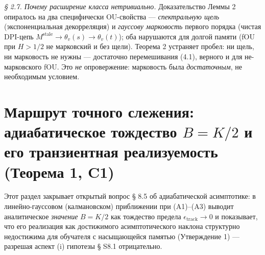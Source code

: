 \documentclass[12pt]{iopart}
\providecommand{\texorpdfstring}[2]{#1}
\begin{document}
\emph{§ 2.7. Почему расширение класса нетривиально.} Доказательство Леммы 2 опиралось на два специфически OU-свойства --- \emph{спектральную щель} (экспоненциальная декорреляция) и \emph{гауссову марковость} первого порядка (чистая DPI-цепь \(M^{\text{stale}} \to \theta_v(s) \to \theta_v(t)\)); оба нарушаются для долгой памяти (fOU при \(H > 1/2\) не марковский и без щели). Теорема 2 устраняет пробел: ни щель, ни марковость не нужны --- достаточно перемешивания (4.1), верного и для не-марковского fOU. Это \emph{не} опровержение: марковость была \emph{достаточным}, не необходимым условием.



\section{\texorpdfstring{Маршрут точного слежения: адиабатическое тождество \(B=K/2\) и его транзиентная реализуемость (Теорема 1, C1)}{Маршрут точного слежения: адиабатическое тождество B=K/2 и его транзиентная реализуемость (Теорема 1, C1)}}\label{ux43cux430ux440ux448ux440ux443ux442-ux442ux43eux447ux43dux43eux433ux43e-ux441ux43bux435ux436ux435ux43dux438ux44f-ux430ux434ux438ux430ux431ux430ux442ux438ux447ux435ux441ux43aux43eux435-ux442ux43eux436ux434ux435ux441ux442ux432ux43e-bk2-ux438-ux435ux433ux43e-ux442ux440ux430ux43dux437ux438ux435ux43dux442ux43dux430ux44f-ux440ux435ux430ux43bux438ux437ux443ux435ux43cux43eux441ux442ux44c-ux442ux435ux43eux440ux435ux43cux430-1-c1}



Этот раздел закрывает открытый вопрос § 8.5 \cite{Andriishin2026b} об адиабатической асимптотике: в линейно-гауссовом (калмановском) приближении при (A1)--(A3) выводит аналитическое \emph{значение} \(B = K/2\) как тождество предела \(\epsilon_{\text{track}}\to 0\) и показывает, что его реализация как достижимого асимптотического наклона структурно недостижима для обучателя с насыщающейся памятью (Утверждение 1) --- разрешая аспект (i) гипотезы § S8.1 отрицательно.
\end{document}
